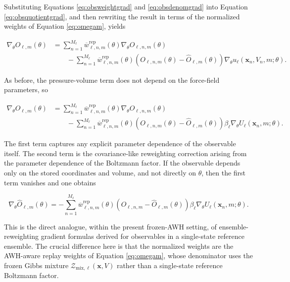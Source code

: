 Substituting Equations \eqref{eq:obsweightgrad} and \eqref{eq:obsdenomgrad} into Equation \eqref{eq:obsquotientgrad}, and then rewriting the result in terms of the normalized weights of Equation \eqref{eq:omegam}, yields

\begin{align}
    \nabla_\theta \widehat{O}_{\ell,m}(\theta)
    &=
    \sum_{n=1}^{M_\ell}
    \overline{w}^{\mathrm{rep}}_{\ell,n,m}(\theta)
    \nabla_\theta O_{\ell,n,m}(\theta)
    \nonumber \\
    &\qquad -
    \sum_{n=1}^{M_\ell}
    \overline{w}^{\mathrm{rep}}_{\ell,n,m}(\theta)
    \left(
        O_{\ell,n,m}(\theta)
        -
        \widehat{O}_{\ell,m}(\theta)
    \right)
    \nabla_\theta
    u_\ell(\mathbf{x}_n, V_n, m; \theta).
    \label{eq:obsgradred}
\end{align}

As before, the pressure-volume term does not depend on the force-field parameters, so

\begin{align}
    \nabla_\theta \widehat{O}_{\ell,m}(\theta)
    &=
    \sum_{n=1}^{M_\ell}
    \overline{w}^{\mathrm{rep}}_{\ell,n,m}(\theta)
    \nabla_\theta O_{\ell,n,m}(\theta)
    \nonumber \\
    &\qquad -
    \sum_{n=1}^{M_\ell}
    \overline{w}^{\mathrm{rep}}_{\ell,n,m}(\theta)
    \left(
        O_{\ell,n,m}(\theta)
        -
        \widehat{O}_{\ell,m}(\theta)
    \right)
    \beta_\ell
    \nabla_\theta
    U_\ell(\mathbf{x}_n, m; \theta).
    \label{eq:obsgradtheta}
\end{align}

The first term captures any explicit parameter dependence of the observable itself. The second term is the covariance-like reweighting correction arising from the parameter dependence of the Boltzmann factor. If the observable depends only on the stored coordinates and volume, and not directly on $\theta$, then the first term vanishes and one obtains

\begin{equation}
    \nabla_\theta \widehat{O}_{\ell,m}(\theta)
    =
    -
    \sum_{n=1}^{M_\ell}
    \overline{w}^{\mathrm{rep}}_{\ell,n,m}(\theta)
    \left(
        O_{\ell,n,m}
        -
        \widehat{O}_{\ell,m}(\theta)
    \right)
    \beta_\ell
    \nabla_\theta
    U_\ell(\mathbf{x}_n, m; \theta).
    \label{eq:obsgradthetaimplicit}
\end{equation}

This is the direct analogue, within the present frozen-AWH setting, of ensemble-reweighting gradient formulas derived for observables in a single-state reference ensemble. The crucial difference here is that the normalized weights are the AWH-aware replay weights of Equation \eqref{eq:omegam}, whose denominator uses the frozen Gibbs mixture $\mathcal{Z}_{\mathrm{mix},\ell}(\mathbf{x}, V)$ rather than a single-state reference Boltzmann factor.

